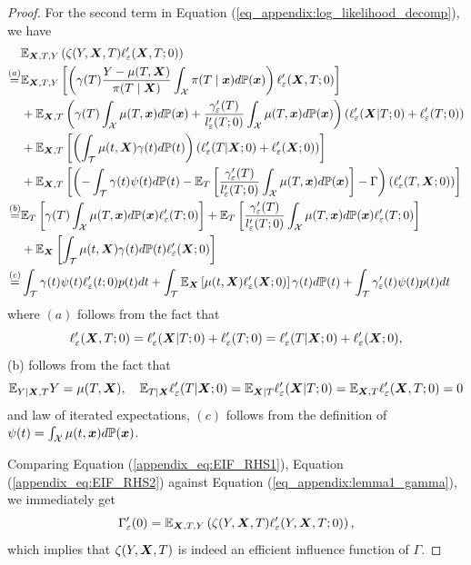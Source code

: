 \begin{proof}
For the second term in Equation (\ref{eq_appendix:log_likelihood_decomp}), we have
\begin{equation}\label{appendix_eq:EIF_RHS2}
\begin{split}
 & \mathbb{E}_{\boldsymbol{X},T,Y}\left(\zeta(Y,\boldsymbol{X},T)\ell'_{\varepsilon}(\boldsymbol{X},T;0)\right)
 \\
\stackrel{(a)}{=} & \mathbb{E}_{\boldsymbol{X},T,Y}\left[\left(\gamma(T)\frac{Y-\mu(T,\boldsymbol{X})}{\pi(T\mid\boldsymbol{X})}\int_{\mathcal{X}}\pi(T\mid\boldsymbol{x})d\mathbb{P}(\boldsymbol{x})\right)\ell'_{\varepsilon}(\boldsymbol{X},T;0)\right]
\\
 & +\mathbb{E}_{\boldsymbol{X},T}\left(\gamma(T)\int_{\mathcal{X}}\mu(T,\boldsymbol{x})d\mathbb{P}(\boldsymbol{x})+\frac{\gamma'_{\varepsilon}(T)}{l'_{\varepsilon}(T;0)}\int_{\mathcal{X}}\mu(T,\boldsymbol{x})d\mathbb{P}(\boldsymbol{x})\right)\left(\ell'_{\varepsilon}(\boldsymbol{X}|T;0)+\ell'_{\varepsilon}(T;0)\right)
 \\
 & +\mathbb{E}_{\boldsymbol{X},T}\left[\left(\int_{\mathcal{\mathcal{T}}}\mu(t,\boldsymbol{X})\text{\ensuremath{\gamma(t)}}d\mathbb{P}(t)\right)\left(\ell'_{\varepsilon}(T|\boldsymbol{X};0)+\ell'_{\varepsilon}(\boldsymbol{X};0)\right)\right]
 \\
 &+\mathbb{E}_{\boldsymbol{X},T}\left[\left(-\int_{\mathcal{T}}\gamma(t)\psi(t)d\mathbb{P}(t)-\mathbb{E}_T\left[\frac{\gamma'_{\varepsilon}(T)}{l'_{\varepsilon}(T;0)}\int_{\mathcal{X}}\mu(T,\boldsymbol{x})d\mathbb{P}(\boldsymbol{x})\right]-\Gamma\right)\left(\ell'_{\varepsilon}(T,\boldsymbol{X};0)\right)\right]
 \\
\stackrel{(b)}{=} & \mathbb{E}_{T}\left[\gamma(T)\int_{\mathcal{X}}\mu(T,\boldsymbol{x})d\mathbb{P}(\boldsymbol{x})\ell'_{\varepsilon}(T;0)\right]+\mathbb{E}_{T}\left[\frac{\gamma'_{\varepsilon}(T)}{l'_{\varepsilon}(T;0)}\int_{\mathcal{X}}\mu(T,\boldsymbol{x})d\mathbb{P}(\boldsymbol{x})\ell_{\varepsilon}'(T;0)\right]
\\
&+\mathbb{E}_{\boldsymbol{X}}\left[\int_{\mathcal{\mathcal{T}}}\mu(t,\boldsymbol{X})\text{\ensuremath{\gamma(t)}}d\mathbb{P}(t)\ell'_{\varepsilon}(\boldsymbol{X};0)\right]
\\
\stackrel{(c)}{=} & \int_{\mathcal{T}}\gamma(t)\psi(t)\ell'_{\varepsilon}(t;0)p(t)dt+\int_{\mathcal{T}}\mathbb{E}_{\boldsymbol{X}}\left[\mu(t,\boldsymbol{X})\ell'_{\varepsilon}(\boldsymbol{X};0)\right]\gamma(t)d\mathbb{P}(t)
+\int_{\mathcal{T}}\gamma'_{\varepsilon}(t)\psi(t)p(t)dt 
\end{split}
\end{equation}
where $(a)$ follows from the fact that  $$\ell'_{\varepsilon}(\boldsymbol{X},T;0)=\ell'_{\varepsilon}(\boldsymbol{X}|T;0)+\ell'_{\varepsilon}(T;0)=\ell'_{\varepsilon}(T|\boldsymbol{X};0)+\ell'_{\varepsilon}(\boldsymbol{X};0),$$
(b) follows from the fact that 
$$\mathbb{E}_{Y|\boldsymbol{X},T}Y=\mu(T,\boldsymbol{X}),\quad \mathbb{E}_{T|\boldsymbol{X}}\ell'_{\varepsilon}(T|\boldsymbol{X};0)=\mathbb{E}_{\boldsymbol{X}|T}\ell'_{\varepsilon}(\boldsymbol{X}|T;0)=\mathbb{E}_{\boldsymbol{X},T}\ell'_{\varepsilon}(\boldsymbol{X},T;0)=0$$
and law of iterated expectations, $(c)$
follows from the definition of $\psi(t)=\int_{\mathcal{X}}\mu(t,\boldsymbol{x})d\mathbb{P}(\boldsymbol{x})$.

Comparing Equation (\ref{appendix_eq:EIF_RHS1}), Equation (\ref{appendix_eq:EIF_RHS2}) against Equation (\ref{eq_appendix:lemma1_gamma}), we immediately get $$\Gamma'_{\varepsilon}(0)=\mathbb{E}_{\boldsymbol{X},T,Y}\left(\zeta(Y,\boldsymbol{X},T)\ell'_{\varepsilon}(Y,\boldsymbol{X},T;0)\right),$$
which implies that $\zeta(Y,\boldsymbol{X},T)$ is indeed an efficient influence
function of $\Gamma$.
\end{proof}








